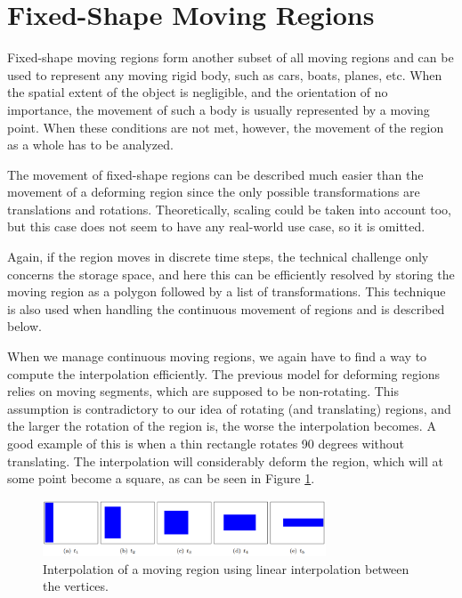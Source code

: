 \section{Fixed-Shape Moving Regions}
\label{section:fixed_shape_regions}

Fixed-shape moving regions form another subset of all moving regions and can be used to represent any moving rigid body, such as cars, boats, planes, etc. When the spatial extent of the object is negligible, and the orientation of no importance, the movement of such a body is usually represented by a moving point. When these conditions are not met, however, the movement of the region as a whole has to be analyzed.

The movement of fixed-shape regions can be described much easier than the movement of a deforming region since the only possible transformations are translations and rotations. Theoretically, scaling could be taken into account too, but this case does not seem to have any real-world use case, so it is omitted.

Again, if the region moves in discrete time steps, the technical challenge only concerns the storage space, and here this can be efficiently resolved by storing the moving region as a polygon followed by a list of transformations. This technique is also used when handling the continuous movement of regions and is described below.

When we manage continuous moving regions, we again have to find a way to compute the interpolation efficiently. The previous model for deforming regions relies on moving segments, which are supposed to be non-rotating. This assumption is contradictory to our idea of rotating (and translating) regions, and the larger the rotation of the region is, the worse the interpolation becomes. A good example of this is when a thin rectangle rotates 90 degrees without translating. The interpolation will considerably deform the region, which will at some point become a square, as can be seen in Figure \ref{fig:vertices_interpolation}.

\begin{figure}[h!]
    \centering
    \includegraphics[width=0.75\textwidth]{images/vertices_interpolation.png}
    \caption[Linear interpolation of the vertices of a moving region]{Interpolation of a moving region using linear interpolation between the vertices. \cite{fmregion}}
    \label{fig:vertices_interpolation}
\end{figure}


